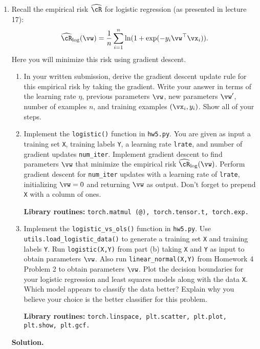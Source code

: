 \documentclass{article}
\def\hcR{\widehat{\cR}}
\theoremstyle{definition}
\theoremstyle{remark}
\newenvironment{Q}
{%
\clearpage
\item
}
{%
\phantom{s}%
\bigskip%
\noindent\textbf{Solution.}
}
\begin{document}
\begin{enumerate}[font={\Large\bfseries},left=0pt]
\begin{Q}
  Recall the empirical risk $\hcR$ for logistic regression (as presented in lecture 17):
  \begin{align*}
  \hcR_{\log}(\vw) = \frac{1}{n} \sum_{i=1}^n \ln ( 1 + \exp( - y_i \vw^\top \vx_i ) ).
  \end{align*}
  Here you will minimize this risk using gradient descent.
  \begin{enumerate}
  \item In your written submission, derive the gradient descent update rule for this empirical risk by taking the gradient.  Write your answer in terms of the learning rate $\eta$, previous parameters $\vw$, new parameters $\vw'$, number of examples $n$, and training examples $(\vx_i, y_i)$.  Show all of your steps.
  \item Implement the \texttt{logistic()} function in \texttt{hw5.py}.  You are given as input a training set \texttt{X}, training labels \texttt{Y}, a learning rate \texttt{lrate}, and number of gradient updates \texttt{num\_iter}.  Implement gradient descent to find parameters $\vw$ that minimize the empirical risk $\hcR_{\log}(\vw)$. Perform gradient descent for \texttt{num\_iter} updates with a learning rate of \texttt{lrate}, initializing $\vw = 0$ and returning $\vw$ as output. Don't forget to prepend \texttt{X} with a column of ones.
  
  \textbf{Library routines:} \texttt{torch.matmul (@), torch.tensor.t, torch.exp.}
  
  \item Implement the \texttt{logistic\_vs\_ols()} function in \texttt{hw5.py}. Use \texttt{utils.load\_logistic\_data()} to generate a training set \texttt{X} and training labels \texttt{Y}.  Run \texttt{logistic(X,Y)} from part (b) taking \texttt{X} and \texttt{Y} as input to obtain parameters $\vw$.  Also run \texttt{linear\_normal(X,Y)} from Homework 4 Problem 2 to obtain parameters $\vw$.  Plot the decision boundaries for your logistic regression and least squares models along with the data \texttt{X}. Which model appears to classify the data better? Explain why you believe your choice is the better classifier for this problem.
  
  \textbf{Library routines:} \texttt{torch.linspace, plt.scatter, plt.plot, plt.show, plt.gcf.}
  

\end{enumerate}
\end{Q}
\end{enumerate}
\end{document}
